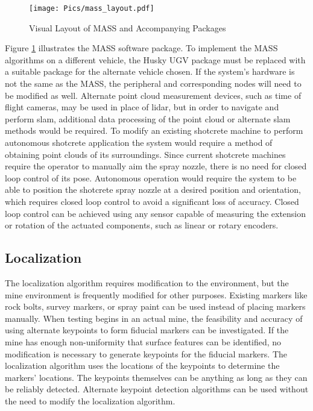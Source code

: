 \begin{figure}
    \centering
\texttt{[image: Pics/mass\_layout.pdf]} 
    \caption{Visual Layout of MASS and Accompanying Packages}
    \label{fig:masslay}
\end{figure}

Figure \ref{fig:masslay} illustrates the MASS software package. To implement the MASS algorithms on a different vehicle, the Husky UGV package must be replaced with a suitable package for the alternate vehicle chosen. If the system's hardware is not the same as the MASS, the peripheral and corresponding nodes will need to be modified as well. Alternate point cloud measurement devices, such as time of flight cameras, may be used in place of \acrshort{lidar}, but in order to navigate and perform \acrshort{slam}, additional data processing of the point cloud or alternate \acrshort{slam} methods would be required. To modify an existing shotcrete machine to perform autonomous shotcrete application the system would require a method of obtaining point clouds of its surroundings. Since current shotcrete machines require the operator to manually aim the spray nozzle, there is no need for closed loop control of its pose. Autonomous operation would require the system to be able to position the shotcrete spray nozzle at a desired position and orientation, which requires closed loop control to avoid a significant loss of accuracy. Closed loop control can be achieved using any sensor capable of measuring the extension or rotation of the actuated components, such as linear or rotary encoders.\\

\subsection{Localization}

The localization algorithm requires modification to the environment, but the mine environment is frequently modified for other purposes. Existing markers like rock bolts, survey markers, or spray paint can be used instead of placing markers manually. When testing begins in an actual mine, the feasibility and accuracy of using alternate keypoints to form fiducial markers can be investigated. If the mine has enough non-uniformity that surface features can be identified, no modification is necessary to generate keypoints for the fiducial markers. The localization algorithm uses the locations of the keypoints to determine the markers' locations. The keypoints themselves can be anything as long as they can be reliably detected. Alternate keypoint detection algorithms can be used without the need to modify the localization algorithm.\\

